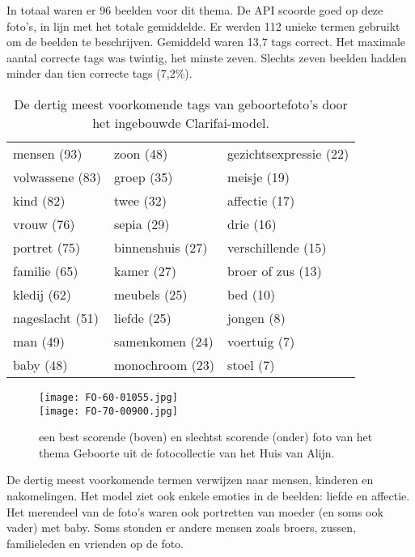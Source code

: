 In totaal waren er 96 beelden voor dit thema. De API scoorde goed op deze foto’s, in lijn met het totale gemiddelde. Er werden 112 unieke termen gebruikt om de beelden te beschrijven. Gemiddeld waren 13,7 tags correct. Het maximale aantal correcte tags was twintig, het minste zeven. Slechts zeven beelden hadden minder dan tien correcte tags (7,2\%).
\begin{table}
	\centering
	\begin{tabular}{*{3}{l}}
		mensen (93) & zoon (48) & gezichtsexpressie (22) \\
		volwassene (83) & 	groep (35) & meisje (19) \\
		kind (82) & twee (32) & affectie (17) \\
		vrouw (76) & sepia (29) & drie (16) \\
		portret (75) & binnenshuis (27) & verschillende (15) \\
		familie (65) & 	kamer (27) & broer of zus (13) \\
		kledij (62) & 	meubels (25) & bed (10) \\
		nageslacht (51) & liefde (25) & jongen (8) \\
		man (49) & samenkomen (24) & voertuig (7) \\
		baby (48) & monochroom (23) & stoel (7) \\	
	\end{tabular}
	\caption[Dertig meest voorkomende tags van geboortefoto's door het ingebouwde model]{De dertig meest voorkomende tags van geboortefoto's door het ingebouwde Clarifai-model.}
	\label{tab:30-termen-geboorte}
\end{table}

\begin{figure}
	\centering
	\texttt{[image: FO-60-01055.jpg]}\hfill
    \\[\smallskipamount]
	\texttt{[image: FO-70-00900.jpg]}\hfill
	\caption[Best en slechtst scorende foto van thema Geboorte]{een best scorende (boven) en slechtst scorende (onder) foto van het thema Geboorte uit de fotocollectie van het Huis van Alijn.}
\end{figure}

De dertig meest voorkomende termen verwijzen naar mensen, kinderen en nakomelingen. Het model ziet ook enkele emoties in de beelden: liefde en affectie. Het merendeel van de foto’s waren ook portretten van moeder (en soms ook vader) met baby. Soms stonden er andere mensen zoals broers, zussen, familieleden en vrienden op de foto. 

